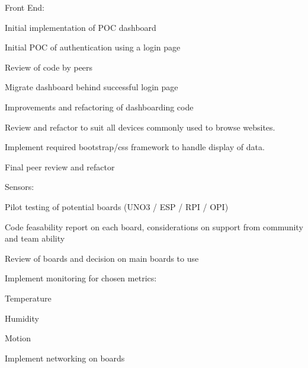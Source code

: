 \documentclass{article}
\begin{document}
\begin{legal}
\begin{legal}
\begin{legal}
                    \end{legal}
                \end{legal}
                \item Front End:
                \begin{legal}
                    \item Initial implementation of POC dashboard
                    \item Initial POC of authentication using a login page
                    \item Review of code by peers
                    \item Migrate dashboard behind successful login page
                    \item Improvements and refactoring of dashboarding code
                    \item Review and refactor to suit all devices commonly used to browse websites.
                    \item Implement required bootstrap/css framework to handle display of data.
                    \item Final peer review and refactor
                \end{legal}
                \newpage
                \item Sensors:
                \begin{legal}
                    \item Pilot testing of potential boards (UNO3\cite{UNO3} / ESP\cite{ESP8266} / RPI\cite{RPI} / OPI\cite{OPI})
                    \begin{legal}
                        \item Code feasability report on each board, considerations on support from community 
                        and team ability
                        \item Review of boards and decision on main boards to use
                    \end{legal}
                    \item Implement monitoring for chosen metrics:
                    \begin{legal}
                        \item Temperature
                        \item Humidity
                        \item Motion
                    \end{legal}
                    \item Implement networking on boards

\end{legal}
\end{legal}
\end{document}
